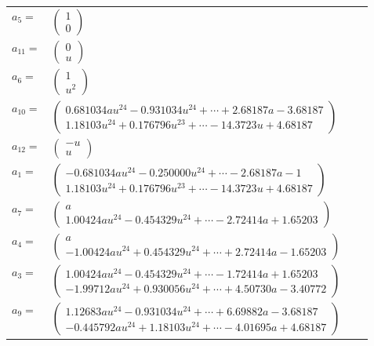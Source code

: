 \documentclass[1p]{elsarticle_modified}
\theoremstyle{definition}
\begin{document}
\begin{tabular}{m{7pt} m{180pt} m{7pt} m{180pt} }
\flushright $a_{5}=$&$\begin{pmatrix}1\\0\end{pmatrix}$ \\
\flushright $a_{11}=$&$\begin{pmatrix}0\\u\end{pmatrix}$ \\
\flushright $a_{6}=$&$\begin{pmatrix}1\\u^2\end{pmatrix}$ \\
\flushright $a_{10}=$&$\begin{pmatrix}0.681034 a u^{24}-0.931034 u^{24}+\cdots+2.68187 a-3.68187\\1.18103 u^{24}+0.176796 u^{23}+\cdots-14.3723 u+4.68187\end{pmatrix}$ \\
\flushright $a_{12}=$&$\begin{pmatrix}- u\\u\end{pmatrix}$ \\
\flushright $a_{1}=$&$\begin{pmatrix}-0.681034 a u^{24}-0.250000 u^{24}+\cdots-2.68187 a-1\\1.18103 u^{24}+0.176796 u^{23}+\cdots-14.3723 u+4.68187\end{pmatrix}$ \\
\flushright $a_{7}=$&$\begin{pmatrix}a\\1.00424 a u^{24}-0.454329 u^{24}+\cdots-2.72414 a+1.65203\end{pmatrix}$ \\
\flushright $a_{4}=$&$\begin{pmatrix}a\\-1.00424 a u^{24}+0.454329 u^{24}+\cdots+2.72414 a-1.65203\end{pmatrix}$ \\
\flushright $a_{3}=$&$\begin{pmatrix}1.00424 a u^{24}-0.454329 u^{24}+\cdots-1.72414 a+1.65203\\-1.99712 a u^{24}+0.930056 u^{24}+\cdots+4.50730 a-3.40772\end{pmatrix}$ \\
\flushright $a_{9}=$&$\begin{pmatrix}1.12683 a u^{24}-0.931034 u^{24}+\cdots+6.69882 a-3.68187\\-0.445792 a u^{24}+1.18103 u^{24}+\cdots-4.01695 a+4.68187\end{pmatrix}$ \\

\end{tabular}
\end{document}
